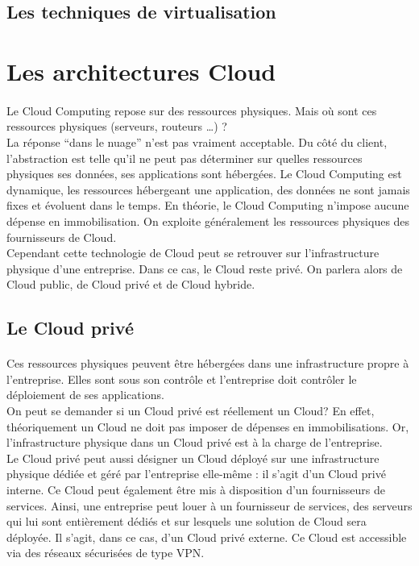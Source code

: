 \documentclass[a4paper,12pt]{report}
\begin{document}
\begin{onehalfspace}
	\subsection{Les techniques de virtualisation}
	
	
	
	\section{Les architectures Cloud}

	\paragraph*{}
	Le Cloud Computing repose sur des ressources physiques. Mais où sont ces ressources physiques (serveurs, routeurs …) ?\\
	La réponse “dans le nuage” n’est pas vraiment acceptable. Du côté du client, l’abstraction est telle qu’il ne peut pas déterminer sur quelles ressources physiques ses données, ses applications sont hébergées. Le Cloud Computing est dynamique, les ressources hébergeant une application, des données ne sont jamais fixes et évoluent dans le temps.
En théorie, le Cloud Computing n’impose aucune dépense en immobilisation. On exploite généralement les ressources physiques des fournisseurs de Cloud.\\
	Cependant cette technologie de Cloud peut se retrouver sur l’infrastructure physique d’une entreprise. Dans ce cas, le Cloud reste privé. On parlera alors de Cloud public, de Cloud privé et de Cloud hybride.
	
	\subsection{Le Cloud privé}
	
	\paragraph*{}
	Ces ressources physiques peuvent être hébergées dans une infrastructure propre à l’entreprise. Elles sont sous son contrôle et l’entreprise doit contrôler le déploiement de ses applications.\\
	On peut se demander si un Cloud privé est réellement un Cloud? En effet, théoriquement un Cloud ne doit pas imposer de dépenses en immobilisations. Or, l’infrastructure physique dans un Cloud privé est à la charge de l’entreprise.\\
	Le Cloud privé peut aussi désigner un Cloud déployé sur une infrastructure physique dédiée et géré par l’entreprise elle-même : il s’agit d’un Cloud privé interne. Ce Cloud peut également être mis à disposition d’un fournisseurs de services. Ainsi, une entreprise peut louer à un fournisseur de services, des serveurs qui lui sont entièrement dédiés et sur lesquels une solution de Cloud sera déployée. Il s’agit, dans ce cas, d’un Cloud privé externe. Ce Cloud est accessible via des réseaux sécurisées de type VPN.
	

\end{onehalfspace}
\end{document}
